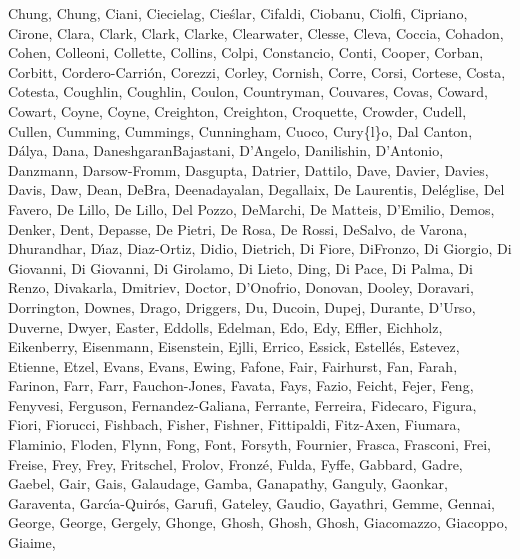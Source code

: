 \documentclass[times,tight]{aastex631}
\begin{document}
\begin{thebibliography}{}
{  {Chung}, {Chung}, {Ciani}, {Ciecielag}, {Cie{\'s}lar}, {Cifaldi}, {Ciobanu},
  {Ciolfi}, {Cipriano}, {Cirone}, {Clara}, {Clark}, {Clark}, {Clarke},
  {Clearwater}, {Clesse}, {Cleva}, {Coccia}, {Cohadon}, {Cohen}, {Colleoni},
  {Collette}, {Collins}, {Colpi}, {Constancio}, {Conti}, {Cooper}, {Corban},
  {Corbitt}, {Cordero-Carri{\'o}n}, {Corezzi}, {Corley}, {Cornish}, {Corre},
  {Corsi}, {Cortese}, {Costa}, {Cotesta}, {Coughlin}, {Coughlin}, {Coulon},
  {Countryman}, {Couvares}, {Covas}, {Coward}, {Cowart}, {Coyne}, {Coyne},
  {Creighton}, {Creighton}, {Croquette}, {Crowder}, {Cudell}, {Cullen},
  {Cumming}, {Cummings}, {Cunningham}, {Cuoco}, {Cury\{l\}o}, {Dal Canton},
  {D{\'a}lya}, {Dana}, {DaneshgaranBajastani}, {D'Angelo}, {Danilishin},
  {D'Antonio}, {Danzmann}, {Darsow-Fromm}, {Dasgupta}, {Datrier}, {Dattilo},
  {Dave}, {Davier}, {Davies}, {Davis}, {Daw}, {Dean}, {DeBra}, {Deenadayalan},
  {Degallaix}, {De Laurentis}, {Del{\'e}glise}, {Del Favero}, {De Lillo}, {De
  Lillo}, {Del Pozzo}, {DeMarchi}, {De Matteis}, {D'Emilio}, {Demos}, {Denker},
  {Dent}, {Depasse}, {De Pietri}, {De Rosa}, {De Rossi}, {DeSalvo}, {de
  Varona}, {Dhurandhar}, {D{\'\i}az}, {Diaz-Ortiz}, {Didio}, {Dietrich}, {Di
  Fiore}, {DiFronzo}, {Di Giorgio}, {Di Giovanni}, {Di Giovanni}, {Di
  Girolamo}, {Di Lieto}, {Ding}, {Di Pace}, {Di Palma}, {Di Renzo},
  {Divakarla}, {Dmitriev}, {Doctor}, {D'Onofrio}, {Donovan}, {Dooley},
  {Doravari}, {Dorrington}, {Downes}, {Drago}, {Driggers}, {Du}, {Ducoin},
  {Dupej}, {Durante}, {D'Urso}, {Duverne}, {Dwyer}, {Easter}, {Eddolls},
  {Edelman}, {Edo}, {Edy}, {Effler}, {Eichholz}, {Eikenberry}, {Eisenmann},
  {Eisenstein}, {Ejlli}, {Errico}, {Essick}, {Estell{\'e}s}, {Estevez},
  {Etienne}, {Etzel}, {Evans}, {Evans}, {Ewing}, {Fafone}, {Fair}, {Fairhurst},
  {Fan}, {Farah}, {Farinon}, {Farr}, {Farr}, {Fauchon-Jones}, {Favata}, {Fays},
  {Fazio}, {Feicht}, {Fejer}, {Feng}, {Fenyvesi}, {Ferguson},
  {Fernandez-Galiana}, {Ferrante}, {Ferreira}, {Fidecaro}, {Figura}, {Fiori},
  {Fiorucci}, {Fishbach}, {Fisher}, {Fishner}, {Fittipaldi}, {Fitz-Axen},
  {Fiumara}, {Flaminio}, {Floden}, {Flynn}, {Fong}, {Font}, {Forsyth},
  {Fournier}, {Frasca}, {Frasconi}, {Frei}, {Freise}, {Frey}, {Frey},
  {Fritschel}, {Frolov}, {Fronz{\'e}}, {Fulda}, {Fyffe}, {Gabbard}, {Gadre},
  {Gaebel}, {Gair}, {Gais}, {Galaudage}, {Gamba}, {Ganapathy}, {Ganguly},
  {Gaonkar}, {Garaventa}, {Garc{\'\i}a-Quir{\'o}s}, {Garufi}, {Gateley},
  {Gaudio}, {Gayathri}, {Gemme}, {Gennai}, {George}, {George}, {Gergely},
  {Ghonge}, {Ghosh}, {Ghosh}, {Ghosh}, {Giacomazzo}, {Giacoppo}, {Giaime},
}
\end{thebibliography}
\end{document}
